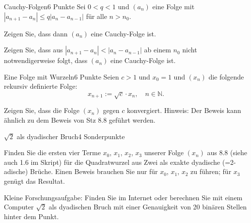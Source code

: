 \documentclass{../problemset}
\begin{document}
\begin{problem}{Cauchy-Folgen}{6 Punkte}
Sei $0 < q < 1$ und $(a_n)$ eine Folge mit $|a_{n+1} - a_n| \leq q |a_n - a_{n-1}|$ für alle $n > n_0$.

\item Zeigen Sie, dass dann $(a_n)$ eine Cauchy-Folge ist.

\item Zeigen Sie, dass aus $|a_{n+1} - a_n| < |a_n - a_{n-1}|$ ab einem $n_0$ nicht notwendigerweise folgt, dass $(a_n)$ eine Cauchy-Folge ist.
\end{problem}

\begin{problem}{Eine Folge mit Wurzeln}{6 Punkte}
Seien $c > 1$ und $x_0 = 1$ und $(x_n)$ die folgende rekursiv definierte Folge:
\[
	x_{n+1} := \sqrt{c} \cdot x_n, \quad n \in \mathbb{N}.
\]

Zeigen Sie, dass die Folge $(x_n)$ gegen $c$ konvergiert. Hinweis: Der Beweis kann ähnlich zu dem Beweis von Stz 8.8 geführt werden.
\end{problem}

\begin{problem}{\(\sqrt{2}\) als dyadischer Bruch}{4 Sonderpunkte}
\item Finden Sie die ersten vier Terme $x_0$, $x_1$, $x_2$, $x_3$ unserer Folge $(x_n)$ aus 8.8 (siehe auch 1.6 im Skript) für die Quadratwurzel aus Zwei als exakte dyadische (=2-adische) Brüche. Einen Beweis brauchen Sie nur für $x_0$, $x_1$, $x_2$ zu führen; für $x_3$ genügt das Resultat.

\item Kleine Forschungsaufgabe: Finden Sie im Internet oder berechnen Sie mit einem Computer \(\sqrt{2}\) als dyadischen Bruch mit einer Genauigkeit von 20 binären Stellen hinter dem Punkt.
\end{problem}
\end{document}
